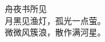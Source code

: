 \documentclass[12pt]{article}
\begin{document}
  \begin{center}
    舟夜书所见\\
    月黑见渔灯，孤光一点萤。\\
    微微风簇浪，散作满河星。\\
  \end{center}
\end{document}
